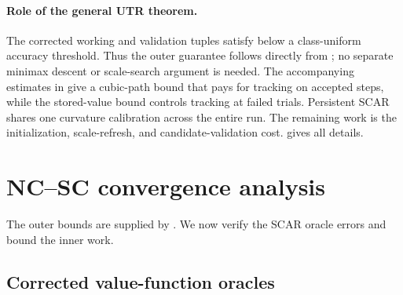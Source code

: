 \documentclass{article}
\begin{document}
\paragraph{Role of the general UTR theorem.}
The corrected working and validation tuples satisfy
 below a class-uniform accuracy threshold.
Thus the outer guarantee follows directly from
; no separate minimax descent or
scale-search argument is needed.  The accompanying estimates in
 give a cubic-path bound that pays for
tracking on accepted steps, while the stored-value bound controls
tracking at failed trials.  Persistent SCAR shares one curvature
calibration across the entire run.  The remaining work is the
initialization, scale-refresh, and candidate-validation cost.
 gives all details.


\section{NC--SC convergence analysis}
\label{sec:ncsc-analysis}

The outer bounds are supplied by
.  We now verify the
SCAR oracle errors and bound the inner work.

\subsection{Corrected value-function oracles}
\label{sec:corrected-oracle-proofs}
\end{document}
